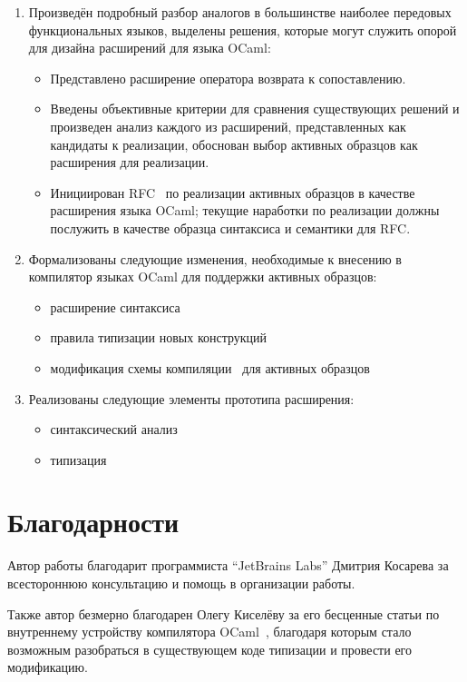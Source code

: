 \begin{enumerate}
  \item Произведён подробный разбор аналогов в большинстве наиболее передовых функциональных языков, выделены решения, которые могут служить опорой для дизайна расширений для языка OCaml:
  \begin{itemize}
      \item Представлено расширение оператора возврата к сопоставлению.
      \item Введены объективные критерии для сравнения существующих решений и произведен анализ каждого из расширений, представленных как кандидаты к реализации, обоснован выбор активных образцов как расширения для реализации.
      \item Инициирован RFC~\cite{myrfc} по реализации активных образцов в качестве расширения языка OCaml; текущие наработки по реализации должны послужить в качестве образца синтаксиса и семантики для RFC.
  \end{itemize}
  \item Формализованы следующие изменения, необходимые к внесению в компилятор языках OCaml для поддержки активных образцов:
  \begin{itemize}
    \item расширение синтаксиса
    \item правила типизации новых конструкций
    \item модификация схемы компиляции~\cite{fessant2001optimizing} для активных образцов
  \end{itemize}
  \item Реализованы следующие элементы прототипа расширения:
  \begin{itemize}
    \item синтаксический анализ
    \item типизация
  \end{itemize}

\end{enumerate}

\section{Благодарности}

Автор работы благодарит программиста ``JetBrains Labs'' Дмитрия \linebreak \mbox{Косарева} за всестороннюю консультацию и помощь в организации работы.

Также автор безмерно благодарен Олегу Киселёву за его бесценные статьи по внутреннему устройству компилятора OCaml~\cite{okmij_typechecker}, благодаря которым стало возможным разобраться в существующем коде типизации и провести его модификацию.


\renewcommand\refname{Список литературы}
%

